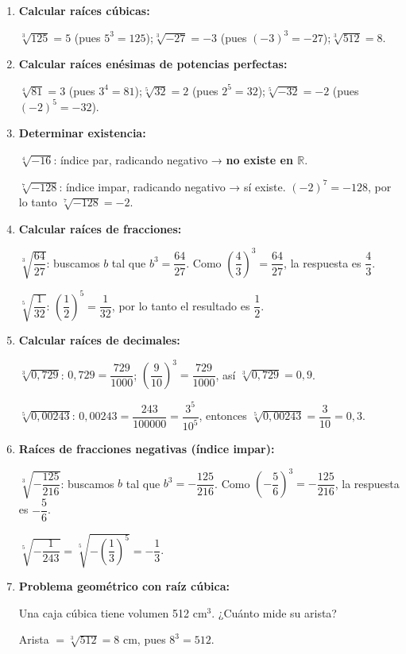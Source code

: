 \documentclass[11pt, letterpaper]{article}
\begin{document}
\begin{tcolorbox}[examplebox, title={Ejemplos}]
\begin{enumerate}[label=\textbf{Ej. \arabic*.}, leftmargin=*]

\item \textbf{Calcular raíces cúbicas:}

$\sqrt[3]{125}=5$ (pues $5^3=125$);\quad $\sqrt[3]{-27}=-3$ (pues $(-3)^3=-27$);\quad $\sqrt[3]{512}=8$.

\item \textbf{Calcular raíces enésimas de potencias perfectas:}

$\sqrt[4]{81}=3$ (pues $3^4=81$);\quad $\sqrt[5]{32}=2$ (pues $2^5=32$);\quad $\sqrt[5]{-32}=-2$ (pues $(-2)^5=-32$).

\item \textbf{Determinar existencia:}

$\sqrt[4]{-16}$: índice par, radicando negativo → \textbf{no existe en $\mathbb{R}$}.

$\sqrt[7]{-128}$: índice impar, radicando negativo → sí existe. $(-2)^7=-128$, por lo tanto $\sqrt[7]{-128}=-2$.

\item \textbf{Calcular raíces de fracciones:}

$\sqrt[3]{\dfrac{64}{27}}$: buscamos $b$ tal que $b^3=\dfrac{64}{27}$. Como $\left(\dfrac{4}{3}\right)^3=\dfrac{64}{27}$, la respuesta es $\dfrac{4}{3}$.

$\sqrt[5]{\dfrac{1}{32}}$: $\left(\dfrac{1}{2}\right)^5=\dfrac{1}{32}$, por lo tanto el resultado es $\dfrac{1}{2}$.

\item \textbf{Calcular raíces de decimales:}

$\sqrt[3]{0{,}729}$: $0{,}729=\dfrac{729}{1000}$; $\left(\dfrac{9}{10}\right)^3=\dfrac{729}{1000}$, así $\sqrt[3]{0{,}729}=0{,}9$.

$\sqrt[5]{0{,}00243}$: $0{,}00243=\dfrac{243}{100000}=\dfrac{3^5}{10^5}$, entonces $\sqrt[5]{0{,}00243}=\dfrac{3}{10}=0{,}3$.

\item \textbf{Raíces de fracciones negativas (índice impar):}

$\sqrt[3]{-\dfrac{125}{216}}$: buscamos $b$ tal que $b^3=-\dfrac{125}{216}$. Como $\left(-\dfrac{5}{6}\right)^3=-\dfrac{125}{216}$, la respuesta es $-\dfrac{5}{6}$.

$\sqrt[5]{-\dfrac{1}{243}}=\sqrt[5]{-\left(\dfrac{1}{3}\right)^5}=-\dfrac{1}{3}$.

\item \textbf{Problema geométrico con raíz cúbica:}

Una caja cúbica tiene volumen 512 cm$^3$. ¿Cuánto mide su arista?

Arista $=\sqrt[3]{512}=8$ cm, pues $8^3=512$.

\end{enumerate}
\end{tcolorbox}
\end{document}
